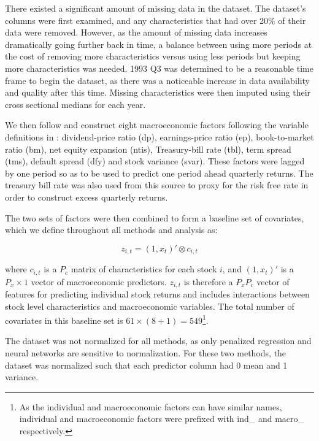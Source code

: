 \documentclass[11pt, a4paper, table]{article}
\begin{document}
There existed a significant amount of missing data in the dataset. The dataset's columns were first examined, and any characteristics that had over 20\% of their data were removed. However, as the amount of missing data increases dramatically going further back in time, a balance between using more periods at the cost of removing more characteristics versus using less periods but keeping more characteristics was needed. 1993 Q3 was determined to be a reasonable time frame to begin the dataset, as there was a noticeable increase in data availability and quality after this time.  Missing characteristics were then imputed using their cross sectional medians for each year. 

We then follow \cite{gu_empirical_2018} and construct eight macroeconomic factors following the variable definitions in \cite{welch_comprehensive_2008}: dividend-price ratio (dp), earnings-price ratio (ep), book-to-market ratio (bm), net equity expansion (ntis), Treasury-bill rate (tbl), term spread (tms), default spread (dfy) and stock variance (svar). These factors were lagged by one period so as to be used to predict one period ahead quarterly returns. The treasury bill rate was also used from this source to proxy for the risk free rate in order to construct excess quarterly returns. 

The two sets of factors were then combined to form a baseline set of covariates, which we define throughout all methods and analysis as:

\begin{equation}
z_{i,t} = (1, x_t)' \otimes c_{i, t}
\end{equation}

where $c_{i,t}$ is a $P_c$ matrix of characteristics for each stock $i$, and $(1, x_t)'$ is a $P_x \times 1$ vector of macroeconomic predictors. $z_{i,t}$ is therefore a $P_x P_c$ vector of features for predicting individual stock returns and includes interactions between stock level characteristics and macroeconomic variables. The total number of covariates in this baseline set is $61 \times (8 + 1) = 549$\footnote{As the individual and macroeconomic factors can have similar names, individual and macroeconomic factors were prefixed with ind\_ and macro\_ respectively.}.
 

The dataset was not normalized for all methods, as only penalized regression and neural networks are sensitive to normalization. For these two methods, the dataset was normalized such that each predictor column had 0 mean and 1 variance.
\end{document}
